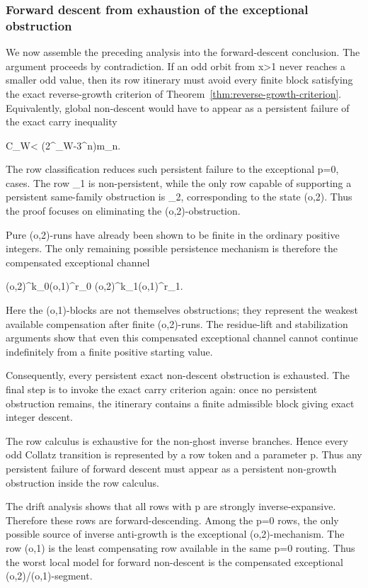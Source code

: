 \documentclass[11pt,letterpaper]{amsart}
\def\({}%
\def\){}%
\def\[{ }%
\def\]{ }%
\theoremstyle{definition}
\theoremstyle{plain}
\theoremstyle{plain}
\theoremstyle{remark}
\begin{document}
\subsubsection{Forward descent from exhaustion of the exceptional obstruction}
\label{subsubsec:forward-descent-from-exhaustion}

We now assemble the preceding analysis into the forward-descent
conclusion.  The argument proceeds by contradiction.  If an odd orbit
from \(x>1\) never reaches a smaller odd value, then its row itinerary
must avoid every finite block satisfying the exact reverse-growth
criterion of Theorem~\ref{thm:reverse-growth-criterion}.  Equivalently,
global non-descent would have to appear as a persistent failure of the
exact carry inequality
\[
C_W<
\left(2^{\Sigma_W}-3^n\right)m_n.
\]

The row classification reduces such persistent failure to the exceptional
\(p=0,\) cases.  The row \(\omega_1\) is non-persistent, while
the only row capable of supporting a persistent same-family obstruction
is \(\Omega_2\), corresponding to the state \((o,2)\).  Thus the proof
focuses on eliminating the \((o,2)\)-obstruction.

Pure \((o,2)\)-runs have already been shown to be finite in the ordinary
positive integers.  The only remaining possible persistence mechanism is
therefore the compensated exceptional channel
\[
(o,2)^{k_0}(o,1)^{r_0}
(o,2)^{k_1}(o,1)^{r_1}\cdots .
\]
Here the \((o,1)\)-blocks are not themselves obstructions; they represent
the weakest available compensation after finite \((o,2)\)-runs.  The
residue-lift and stabilization arguments show that even this compensated
exceptional channel cannot continue indefinitely from a finite positive
starting value.

Consequently, every persistent exact non-descent obstruction is exhausted.
The final step is to invoke the exact carry criterion again: once no
persistent obstruction remains, the itinerary contains a finite admissible
block giving exact integer descent.

The row calculus is exhaustive for the non-ghost inverse branches.  Hence
every odd Collatz transition is represented by a row token and a parameter
\(p\).  Thus any persistent failure of forward descent must appear
as a persistent non-growth obstruction inside the row calculus.

The drift analysis shows that all rows with \(p\) are strongly
inverse-expansive.  Therefore these rows are forward-descending.  Among
the \(p=0\) rows, the only possible source of inverse anti-growth is the
exceptional \((o,2)\)-mechanism.  The row \((o,1)\) is the least
compensating row available in the same \(p=0\) routing.  Thus the worst
local model for forward non-descent is the compensated exceptional
\((o,2)/(o,1)\)-segment.
\end{document}
